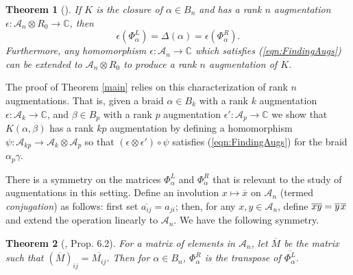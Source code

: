 \documentclass[11pt]{amsart}
\def\C{{\mathbb C}}
\def\A{{\mathcal A}}
\def\cl{\mathcal}
\newtheorem{thm}{Theorem}[section]
\theoremstyle{definition}
\begin{document}
  \begin{thm}[\cite{Cor13a}] If $K$ is the closure of $\alpha\in B_n$ and has a rank $n$ augmentation $\epsilon:\A_n\otimes R_0\to\C$, then 
    \begin{equation}
    \epsilon(\Phi_\alpha^L)=\Delta(\alpha)=\epsilon(\Phi_\alpha^R).
    \label{eqn:FindingAugs}
    \end{equation}
    Furthermore, any homomorphism $\epsilon:\A_n\to\C$ which satisfies (\ref{eqn:FindingAugs}) can be extended to $\A_n\otimes R_0$ to produce a rank $n$ augmentation of $K$. 
  \label{thm:RanknAugs}
  \end{thm}

  The proof of Theorem \ref{main} relies on this characterization of rank $n$ augmentations. That is, given a braid $\alpha\in B_k$ with a rank $k$ augmentation $\epsilon:\cl A_k\to\C$, and $\beta\in B_p$ with a rank $p$ augmentation $\epsilon':\cl A_p\to\C$ we show that $K(\alpha,\beta)$ has a rank $kp$ augmentation by defining a homomorphism $\psi:\cl A_{kp}\to\cl A_k\otimes\cl A_p$ so that $(\epsilon\otimes\epsilon')\circ\psi$ satisfies (\ref{eqn:FindingAugs}) for the braid $\alpha_p\gamma$.

  There is a symmetry on the matrices $\Phi_\alpha^L$ and $\Phi_\alpha^R$ that is relevant to the study of augmentations in this setting. Define an involution $x\mapsto\overline x$ on $\A_n$ (termed \emph{conjugation}) as follows: first set $\overline{a_{ij}}=a_{ji}$; then, for any $x,y\in\A_n$, define $\overline{xy}=\overline y\hspace*{1pt}\overline x$ and extend the operation linearly to $\A_n$. We have the following symmetry.

  \begin{thm}[\cite{Ng05}, Prop.\hspace*{-0.7pt} 6.2]For a matrix of elements in $\A_n$, let $\overline{M}$ be the matrix such that $\left(\overline M\right)_{ij} = \overline{M_{ij}}$. Then for $\alpha\in B_n$, $\Phi_\alpha^R$ is the transpose of $\overline{\Phi_\alpha^L}$.
  \label{thm:Transpose}
  \end{thm}

\end{document}
